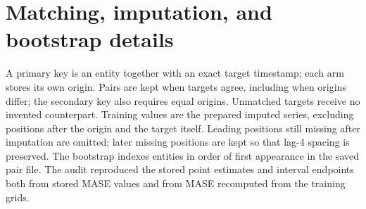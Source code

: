 \documentclass[11pt]{article}
\begin{document}
\section{Matching, imputation, and bootstrap details}
A primary key is an entity together with an exact target timestamp; each arm stores its own origin. Pairs are kept when targets agree, including when origins differ; the secondary key also requires equal origins. Unmatched targets receive no invented counterpart. Training values are the prepared imputed series, excluding positions after the origin and the target itself. Leading positions still missing after imputation are omitted; later missing positions are kept so that lag-4 spacing is preserved. The bootstrap indexes entities in order of first appearance in the saved pair file. The audit reproduced the stored point estimates and interval endpoints both from stored MASE values and from MASE recomputed from the training grids.
\end{document}
